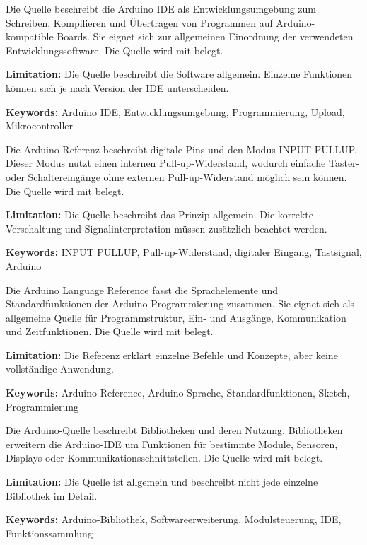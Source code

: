 
{ 
	Die Quelle beschreibt die Arduino IDE als Entwicklungsumgebung zum Schreiben, Kompilieren und Übertragen von Programmen auf Arduino-kompatible Boards. Sie eignet sich zur allgemeinen Einordnung der verwendeten Entwicklungssoftware. Die Quelle wird mit \cite{arduino:ide} belegt.
	
	\bigskip
	
	\textbf{Limitation:} Die Quelle beschreibt die Software allgemein. Einzelne Funktionen können sich je nach Version der IDE unterscheiden.
	
	\scriptsize{\textbf{Keywords:} Arduino IDE, Entwicklungsumgebung, Programmierung, Upload, Mikrocontroller}
}



{ 
	Die Arduino-Referenz beschreibt digitale Pins und den Modus INPUT PULLUP. Dieser Modus nutzt einen internen Pull-up-Widerstand, wodurch einfache Taster- oder Schaltereingänge ohne externen Pull-up-Widerstand möglich sein können. Die Quelle wird mit \cite{arduino_inputpullup} belegt.
	
	\bigskip
	
	\textbf{Limitation:} Die Quelle beschreibt das Prinzip allgemein. Die korrekte Verschaltung und Signalinterpretation müssen zusätzlich beachtet werden.
	
	\scriptsize{\textbf{Keywords:} INPUT PULLUP, Pull-up-Widerstand, digitaler Eingang, Tastsignal, Arduino}
}



{ 
	Die Arduino Language Reference fasst die Sprachelemente und Standardfunktionen der Arduino-Programmierung zusammen. Sie eignet sich als allgemeine Quelle für Programmstruktur, Ein- und Ausgänge, Kommunikation und Zeitfunktionen. Die Quelle wird mit \cite{arduino:language-reference} belegt.
	
	\bigskip
	
	\textbf{Limitation:} Die Referenz erklärt einzelne Befehle und Konzepte, aber keine vollständige Anwendung.
	
	\scriptsize{\textbf{Keywords:} Arduino Reference, Arduino-Sprache, Standardfunktionen, Sketch, Programmierung}
}



{ 
	Die Arduino-Quelle beschreibt Bibliotheken und deren Nutzung. Bibliotheken erweitern die Arduino-IDE um Funktionen für bestimmte Module, Sensoren, Displays oder Kommunikationsschnittstellen. Die Quelle wird mit \cite{arduinoLibraries:2025} belegt.
	
	\bigskip
	
	\textbf{Limitation:} Die Quelle ist allgemein und beschreibt nicht jede einzelne Bibliothek im Detail.
	
	\scriptsize{\textbf{Keywords:} Arduino-Bibliothek, Softwareerweiterung, Modulsteuerung, IDE, Funktionssammlung}
}


